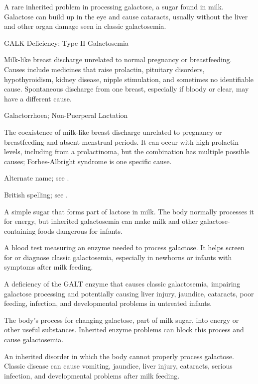  A rare inherited problem in processing galactose, a sugar found in milk. Galactose can build up in the eye and cause cataracts, usually without the liver and other organ damage seen in classic galactosemia.

\synonyms
GALK Deficiency; Type II Galactosemia

 Milk-like breast discharge unrelated to normal pregnancy or breastfeeding. Causes include medicines that raise prolactin, pituitary disorders, hypothyroidism, kidney disease, nipple stimulation, and sometimes no identifiable cause. Spontaneous discharge from one breast, especially if bloody or clear, may have a different cause.

\synonyms
Galactorrhoea; Non-Puerperal Lactation

 The coexistence of milk-like breast discharge unrelated to pregnancy or breastfeeding and absent menstrual periods. It can occur with high prolactin levels, including from a prolactinoma, but the combination has multiple possible causes; Forbes-Albright syndrome is one specific cause.

 Alternate name; see .

 British spelling; see .

 A simple sugar that forms part of lactose in milk. The body normally processes it for energy, but inherited galactosemia can make milk and other galactose-containing foods dangerous for infants.

 A blood test measuring an enzyme needed to process galactose. It helps screen for or diagnose classic galactosemia, especially in newborns or infants with symptoms after milk feeding.

 A deficiency of the GALT enzyme that causes classic galactosemia, impairing galactose processing and potentially causing liver injury, jaundice, cataracts, poor feeding, infection, and developmental problems in untreated infants.

 The body’s process for changing galactose, part of milk sugar, into energy or other useful substances. Inherited enzyme problems can block this process and cause galactosemia.

 An inherited disorder in which the body cannot properly process galactose. Classic disease can cause vomiting, jaundice, liver injury, cataracts, serious infection, and developmental problems after milk feeding.

